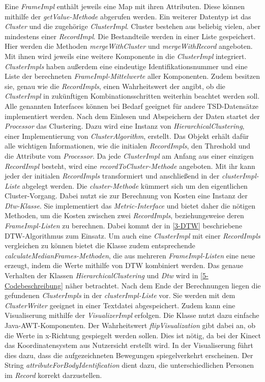 Eine \emph{FrameImpl} enthält jeweils eine Map mit ihren Attributen.
Diese können mithilfe der \emph{getValue-Methode} abgerufen werden.
Ein weiterer Datentyp ist das \emph{Cluster} und die zugehörige \emph{ClusterImpl}.
Cluster bestehen aus beliebig vielen, aber mindestens einer \emph{RecordImpl}.
Die Bestandteile werden in einer Liste gespeichert.
Hier werden die Methoden \emph{mergeWithCluster} und \emph{mergeWithRecord} angeboten.
Mit ihnen wird jeweils eine weitere Komponente in die \emph{ClusterImpl} integriert.
\emph{ClusterImpls} haben außerdem eine eindeutige Identifikationsnummer und eine Liste der berechneten
\emph{FrameImpl-Mittelwerte} aller Komponenten.
Zudem besitzen sie, genau wie die \emph{RecordImpls}, einen Wahrheitswert der angibt,
ob die \emph{ClusterImpl} in zukünftigen Kombinationsschritten weiterhin beachtet werden soll.
Alle genannten Interfaces können bei Bedarf geeignet für andere \ac{TSD}-Datensätze implementiert werden.
Nach dem Einlesen und Abspeichern der Daten startet der \emph{Processor} das Clustering.
Dazu wird eine Instanz von \emph{HierarchicalClustering}, einer Implementierung von \emph{ClusterAlgorithm}, erstellt.
Das Objekt erhält dafür alle wichtigen Informationen,
wie die initialen \emph{RecordImpls}, den Threshold und die Attribute vom \emph{Processor}.
Da jede \emph{ClusterImpl} am Anfang aus einer einzigen \emph{RecordImpl} besteht,
wird eine \emph{recordToCluster-Methode} angeboten.
Mit ihr kann jeder der initialen \emph{RecordImpls} transformiert
und anschließend in der \emph{clusterImpl-Liste} abgelegt werden.
Die \emph{cluster-Methode} kümmert sich um den eigentlichen Cluster-Vorgang.
Dabei nutzt sie zur Berechnung von Kosten eine Instanz der \emph{Dtw-Klasse}.
Sie implementiert das \emph{Metric-Interface} und bietet daher die nötigen Methoden,
um die Kosten zwischen zwei \emph{RecordImpls}, beziehungsweise deren \emph{FrameImpl-Listen} zu berechnen.
Dabei kommt der in \autoref{3-DTW} beschriebene \ac{DTW}-Algorithmus zum Einsatz.
Um auch eine \emph{ClusterImpl} mit einer \emph{RecordImpls} vergleichen zu können bietet die Klasse zudem entsprechende
\emph{calculateMedianFrames-Methoden}, die aus mehreren \emph{FrameImpl-Listen} eine neue erzeugt,
indem die Werte mithilfe von \ac{DTW} kombiniert werden.
Das genaue Verhalten der Klassen \emph{HierarchicalClustering} und \emph{Dtw} wird in \autoref{5-Codebeschreibung} näher betrachtet.
Nach dem Ende der Berechnungen liegen die gefundenen \emph{ClusterImpls} in der \emph{clusterImpl-Liste} vor.
Sie werden mit dem \emph{ClusterWriter} geeignet in einer Textdatei abgespeichert.
Zudem kann eine Visualiserung mithilfe der \emph{VisualizerImpl} erfolgen.
Die Klasse nutzt dazu einfache Java-AWT-Komponenten.
Der Wahrheitswert \emph{flipVisualization} gibt dabei an,
ob die Werte in x-Richtung gespiegelt werden sollen.
Dies ist nötig, da bei der Kinect das Koordinatensystem aus Nutzersicht erstellt wird.
In der Visualiserung führt dies dazu, dass die aufgezeichneten Bewegungen spiegelverkehrt erscheinen.
Der String \emph{attributeForBodyIdentification} dient dazu,
die unterschiedlichen Personen im \emph{Record} korrekt darzustellen.

